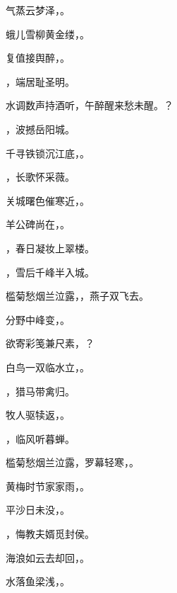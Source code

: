 \documentclass[12pt, a4paper, addpoints]{exam}
\begin{document}
\begin{multicols}{2}
\begin{questions}
\question[1] 

\question[2] 气蒸云梦泽，\uline{\qquad\qquad\qquad\qquad}。

\question[2] 蛾儿雪柳黄金缕，\uline{\qquad\qquad\qquad\qquad}。

\question[2] 复值接舆醉，\uline{\qquad\qquad\qquad\qquad}。

\question[2] \uline{\qquad\qquad\qquad\qquad}，端居耻圣明。

\question[2] 水调数声持酒听，午醉醒来愁未醒。\uline{\qquad\qquad\qquad\qquad}？

\question[2] \uline{\qquad\qquad\qquad\qquad}，波撼岳阳城。

\question[2] 千寻铁锁沉江底，\uline{\qquad\qquad\qquad\qquad}。

\question[2] \uline{\qquad\qquad\qquad\qquad}，长歌怀采薇。

\question[1] 关城曙色催寒近，\uline{\qquad\qquad\qquad\qquad}。

\question[2] 羊公碑尚在，\uline{\qquad\qquad\qquad\qquad}。

\question[2] \uline{\qquad\qquad\qquad\qquad}，春日凝妆上翠楼。

\question[2] \uline{\qquad\qquad\qquad\qquad}，雪后千峰半入城。

\question[2] 槛菊愁烟兰泣露，\uline{\qquad\qquad\qquad\qquad}，燕子双飞去。

\question[2] 分野中峰变，\uline{\qquad\qquad\qquad\qquad}。

\question[2] 欲寄彩笺兼尺素，\uline{\qquad\qquad\qquad\qquad}？

\question[2] 白鸟一双临水立，\uline{\qquad\qquad\qquad\qquad}。

\question[2] \uline{\qquad\qquad\qquad\qquad}，猎马带禽归。

\question[2] 牧人驱犊返，\uline{\qquad\qquad\qquad\qquad}。

\question[2] \uline{\qquad\qquad\qquad\qquad}，临风听暮蝉。

\question[2] 槛菊愁烟兰泣露，罗幕轻寒，\uline{\qquad\qquad\qquad\qquad}。

\question[2] 黄梅时节家家雨，\uline{\qquad\qquad\qquad\qquad}。

\question[2] 平沙日未没，\uline{\qquad\qquad\qquad\qquad}。

\question[2] \uline{\qquad\qquad\qquad\qquad}，悔教夫婿觅封侯。

\question[2] 海浪如云去却回，\uline{\qquad\qquad\qquad\qquad}。

\question[2] 水落鱼梁浅，\uline{\qquad\qquad\qquad\qquad}。

\end{questions}
\end{multicols}
\end{document}
